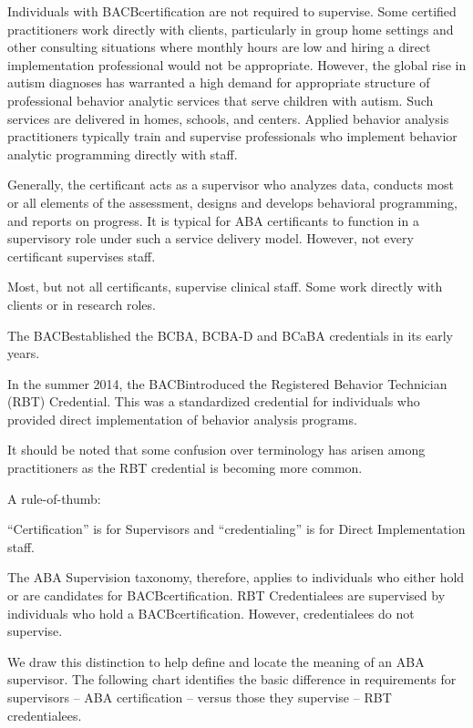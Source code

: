 Individuals with BACB\textregistered certification are not required to supervise. Some certified practitioners work directly with clients, particularly in group home settings and other consulting situations where monthly hours are low and hiring a direct implementation professional would not be appropriate. However, the global rise in autism diagnoses has warranted a high demand for appropriate structure of professional behavior analytic services that serve children with autism. Such services are delivered in homes, schools, and centers. Applied behavior analysis practitioners typically train and supervise professionals who implement behavior analytic programming directly with staff. 

Generally, the certificant acts as a supervisor who analyzes data, conducts most or all elements of the assessment, designs and develops behavioral programming, and reports on progress. It is typical for ABA certificants to function in a supervisory role under such a service delivery model. However, not every certificant supervises staff.

Most, but not all certificants, supervise clinical staff. Some work directly with clients or in research roles.

The BACB\textregistered established the BCBA, BCBA-D and BCaBA credentials in its early years. 

In the summer 2014, the BACB\textregistered introduced the Registered Behavior Technician (RBT) Credential. This was a standardized credential for individuals who provided direct implementation of behavior analysis programs. 

It should be noted that some confusion over terminology has arisen among practitioners as the RBT credential is becoming more common. 

A rule-of-thumb:

``Certification'' is for Supervisors and ``credentialing'' is for Direct Implementation staff.

The ABA Supervision taxonomy, therefore, applies to individuals who either hold or are candidates for BACB\textregistered certification. RBT Credentialees are supervised by individuals who hold a BACB\textregistered certification. However, credentialees do not supervise.

We draw this distinction to help define and locate the meaning of an ABA supervisor. The following chart identifies the basic difference in requirements for supervisors – ABA certification – versus those they supervise – RBT credentialees.

